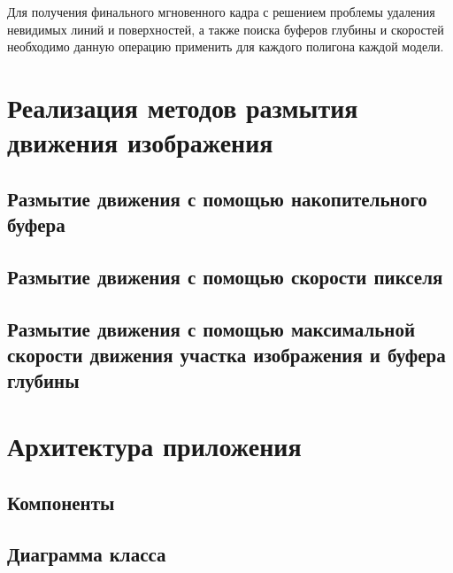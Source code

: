 Для получения финального мгновенного кадра с решением проблемы удаления невидимых линий и поверхностей, а также поиска буферов глубины и скоростей необходимо данную операцию применить для каждого полигона каждой модели.

\section{Реализация методов размытия движения изображения}

\subsection{Размытие движения с помощью накопительного буфера}


\subsection{Размытие движения с помощью скорости пикселя}
\subsection{Размытие движения с помощью максимальной скорости движения участка изображения и буфера глубины}

\section{Архитектура приложения}

\subsection{Компоненты}
\subsection{Диаграмма класса}




